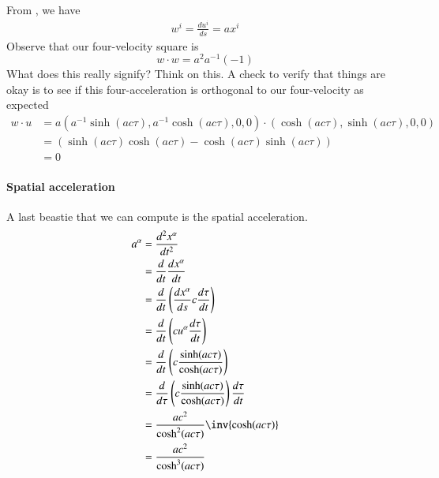 {%
%
From , we have
%
\begin{equation}\label{eqn:relativisticElectrodynamicsT2:2160}
\begin{aligned}
w^i = \frac{ du^i }{ds} = a x^i
\end{aligned}
\end{equation}
%
Observe that our four-velocity square is
%
\begin{equation}\label{eqn:relativisticElectrodynamicsT2:78}
w \cdot w = a^2 a^{-1} (-1)
\end{equation}
%
What does this really signify?  Think on this.  A check to verify that things are okay is to see if this four-acceleration is orthogonal to our four-velocity as expected
%
\begin{equation}\label{eqn:relativisticElectrodynamicsT2:2180}
\begin{aligned}
w \cdot u
&=
a ( a^{-1} \sinh( a c \tau), a^{-1} \cosh( a c \tau ), 0, 0 ) \cdot ( \cosh( a c \tau ), \sinh( a c \tau ), 0, 0) \\
&=
( \sinh(a c \tau)\cosh(a c \tau) - \cosh(a c \tau) \sinh(a c \tau) ) \\
&=
0
\end{aligned}
\end{equation}
%
\paragraph{Spatial acceleration}

A last beastie that we can compute is the spatial acceleration.
%
\begin{equation}\label{eqn:relativisticElectrodynamicsT2:2200}
\begin{aligned}
a^\alpha
&= \frac{d^2 x^\alpha}{dt^2} \\
&= \frac{d}{dt} \frac{dx^\alpha}{dt} \\
&= \frac{d}{dt} \left( \frac{dx^\alpha}{ds} c \frac{d\tau}{dt} \right) \\
&= \frac{d}{dt} \left( c u^\alpha \frac{d\tau}{dt} \right) \\
&= \frac{d}{dt} \left( c \frac{\sinh(a c \tau)}{\cosh(a c \tau)} \right) \\
&= \frac{d}{d\tau} \left( c \frac{\sinh(a c \tau)}{\cosh(a c \tau)} \right) \frac{d\tau}{dt} \\
&= \frac{a c^2}{\cosh^2(a c \tau)} \inv{\cosh(a c \tau) } \\
&= \frac{a c^2}{\cosh^3(a c \tau)} \\
\end{aligned}
\end{equation}
%
}
